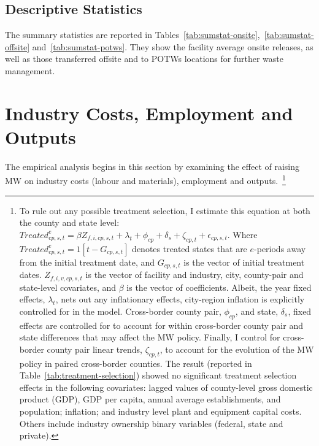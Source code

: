 \documentclass[12pt, english]{article}
\begin{document}
    \subsection{Descriptive Statistics}\label{subsec:descriptive-statistics}
    The summary statistics are reported in Tables~\ref{tab:sumstat-onsite},~\ref{tab:sumstat-offsite} and~\ref{tab:sumstat-potws}. They show the facility average onsite releases, as well as those transferred offsite and to POTWs locations for further waste management.
    
    
    
%    


    \section{Industry Costs, Employment and Outputs}\label{sec:industry-costs-employment-and-outputs}
    The empirical analysis begins in this section by examining the effect of raising MW on industry costs (labour and materials), employment and outputs.~\footnote{\tiny To rule out any possible treatment selection, I estimate this equation at both the county and state level: $Treated_{cp,s,t}^e = \beta Z_{f,i,cp,s,t} + \lambda_{t} + \phi_{cp} + \delta_{s} + \zeta_{cp,t} + \epsilon_{cp,s,t}$. Where $Treated_{cp,s,t}^e = 1[t - G_{cp,s,t}]$ denotes treated states that are $e$-periods away from the initial treatment date, and $G_{cp,s,t}$ is the vector of initial treatment dates. $Z_{f,i,v,cp,s,t}$ is the vector of facility and industry, city, county-pair and state-level covariates, and $\beta$ is the vector of coefficients. Albeit, the year fixed effects, $\lambda_{t}$, nets out any inflationary effects, city-region inflation is explicitly controlled for in the model. Cross-border county pair, $\phi_{cp}$, and state, $\delta_{s}$, fixed effects are controlled for to account for within cross-border county pair and state differences that may affect the MW policy. Finally, I control for cross-border county pair linear trends, $\zeta_{cp,t}$, to account for the evolution of the MW policy in paired cross-border counties. The result (reported in Table~\ref{tab:treatment-selection}) showed no significant treatment selection effects in the following covariates: lagged values of county-level gross domestic product (GDP), GDP per capita, annual average establishments, and population; inflation; and industry level plant and equipment capital costs. Others include industry ownership binary variables (federal, state and private).}
\end{document}
